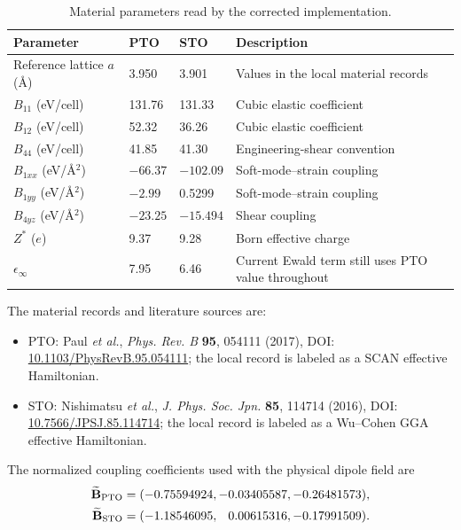 \documentclass[11pt,a4paper]{article}
\begin{document}
\begin{table}[htbp]
\centering
\small
\begin{tabularx}{\textwidth}{L{3.1cm}C{2.25cm}C{2.25cm}Y}
\toprule
\textbf{Parameter} & \textbf{PTO} & \textbf{STO} & \textbf{Description}\\
\midrule
Reference lattice $a$ (\AA) & 3.950 & 3.901 & Values in the local material records\\
$B_{11}$ (eV/cell) & 131.76 & 131.33 & Cubic elastic coefficient\\
$B_{12}$ (eV/cell) & 52.32 & 36.26 & Cubic elastic coefficient\\
$B_{44}$ (eV/cell) & 41.85 & 41.30 & Engineering-shear convention\\
$B_{1xx}$ (eV/\AA$^2$) & $-66.37$ & $-102.09$ & Soft-mode--strain coupling\\
$B_{1yy}$ (eV/\AA$^2$) & $-2.99$ & 0.5299 & Soft-mode--strain coupling\\
$B_{4yz}$ (eV/\AA$^2$) & $-23.25$ & $-15.494$ & Shear coupling\\
$Z^*$ ($e$) & 9.37 & 9.28 & Born effective charge\\
$\epsilon_\infty$ & 7.95 & 6.46 & Current Ewald term still uses PTO value throughout\\
\bottomrule
\end{tabularx}
\caption{Material parameters read by the corrected implementation.}
\end{table}

The material records and literature sources are:
\begin{itemize}
  \item PTO: Paul \textit{et al.}, \textit{Phys. Rev. B} \textbf{95}, 054111 (2017), DOI: \href{https://doi.org/10.1103/PhysRevB.95.054111}{10.1103/PhysRevB.95.054111}; the local record is labeled as a SCAN effective Hamiltonian.
  \item STO: Nishimatsu \textit{et al.}, \textit{J. Phys. Soc. Jpn.} \textbf{85}, 114714 (2016), DOI: \href{https://doi.org/10.7566/JPSJ.85.114714}{10.7566/JPSJ.85.114714}; the local record is labeled as a Wu--Cohen GGA effective Hamiltonian.
\end{itemize}

The normalized coupling coefficients used with the physical dipole field are
\begin{align}
 \widetilde{\mathbf B}_{\rm PTO}
 &=(-0.75594924,-0.03405587,-0.26481573),\\
 \widetilde{\mathbf B}_{\rm STO}
 &=(-1.18546095,\phantom{-}0.00615316,-0.17991509).
\end{align}
\end{document}
